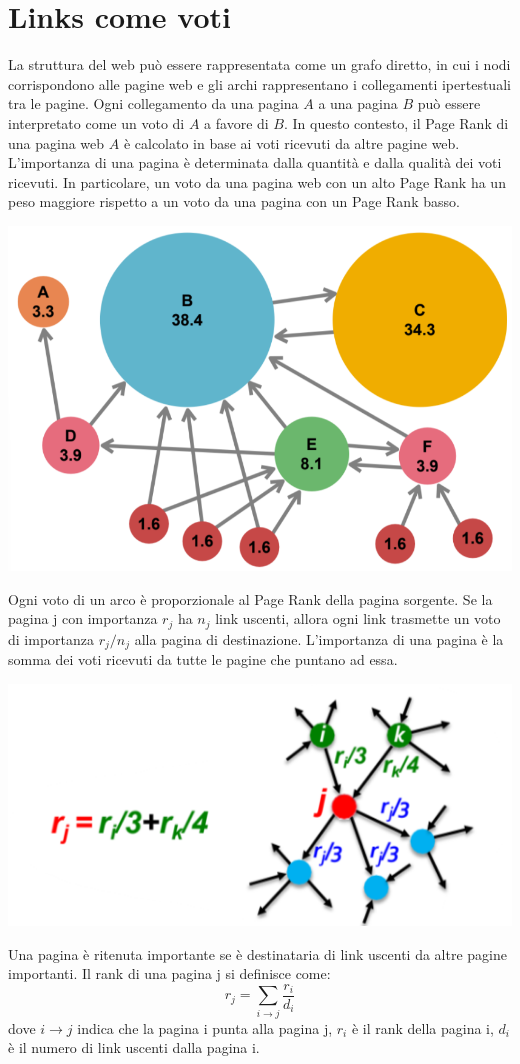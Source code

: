 \documentclass{report}
\begin{document}
	\section{Links come voti}
	La struttura del web può essere rappresentata come un grafo diretto, in cui i nodi corrispondono alle pagine web e gli archi rappresentano i collegamenti ipertestuali tra le pagine. Ogni collegamento da una pagina $A$ a una pagina $B$ può essere interpretato come un voto di $A$ a favore di $B$. In questo contesto, il Page Rank di una pagina web $A$ è calcolato in base ai voti ricevuti da altre pagine web. L'importanza di una pagina è determinata dalla quantità e dalla qualità dei voti ricevuti. In particolare, un voto da una pagina web con un alto Page Rank ha un peso maggiore rispetto a un voto da una pagina con un Page Rank basso.
	\begin{center}
		\includegraphics[scale=0.5]{assets/page-rank-graph.png}
	\end{center}
	Ogni voto di un arco è proporzionale al Page Rank della pagina sorgente. Se la pagina j con importanza $r_j$ ha $n_j$ link uscenti, allora ogni link trasmette un voto di importanza $r_j/n_j$ alla pagina di destinazione. L'importanza di una pagina è la somma dei voti ricevuti da tutte le pagine che puntano ad essa.
	\begin{center}
		\includegraphics[scale=0.5]{assets/page-rank-votes.png}
	\end{center}
	Una pagina è ritenuta importante se è destinataria di link uscenti da altre pagine importanti. Il rank di una pagina j si definisce come:
	\[
		r_j = \sum_{i \rightarrow j} \frac{r_i}{d_i}
	\]
	dove $i \rightarrow j$ indica che la pagina i punta alla pagina j, $r_i$ è il rank della pagina i, $d_i$ è il numero di link uscenti dalla pagina i.
\end{document}
